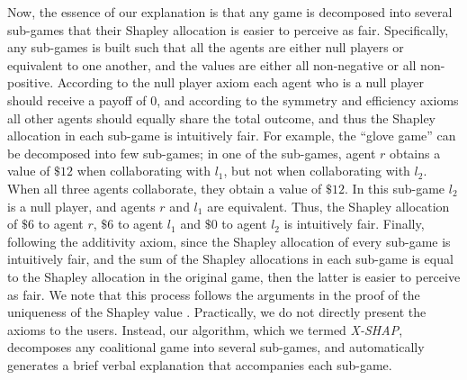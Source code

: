 \documentclass[letterpaper]{article} %
\begin{document}
Now, the essence of our explanation is that any game is decomposed into several sub-games that their Shapley allocation is easier to perceive as fair. Specifically, any sub-games is built such that all the agents are either null players or equivalent to one another, and the values are either all non-negative or all non-positive.
According to the null player axiom each agent who is a null player should receive a payoff of $0$, and according to the symmetry and efficiency axioms all other agents should equally share the total outcome, and thus the Shapley allocation in each sub-game is intuitively fair.
For example, the ``glove game'' can be decomposed into few sub-games; in one of the sub-games, agent $r$ obtains a value of $\$12$ when collaborating with $l_1$, but not when collaborating with $l_2$. When all three agents collaborate, they obtain a value of $\$12$. In this sub-game $l_2$ is a null player, and agents $r$ and $l_1$ are equivalent. Thus, the Shapley allocation of $\$6$ to agent $r$, $\$6$ to agent $l_1$ and $\$0$ to agent $l_2$ is intuitively fair. Finally, following the additivity axiom, since the Shapley allocation of every sub-game is intuitively fair, and the sum of the Shapley allocations in each sub-game is equal to the Shapley allocation in the original game, then the latter is easier to perceive as fair. We note that this process follows the arguments in the proof of the uniqueness of the Shapley value \cite{shapley1953value}.
Practically, we do not directly present the axioms to the users. Instead, our algorithm, which we termed \textit{X-SHAP}, decomposes any coalitional game into several sub-games, and automatically generates a brief verbal explanation that accompanies each sub-game.
\end{document}
